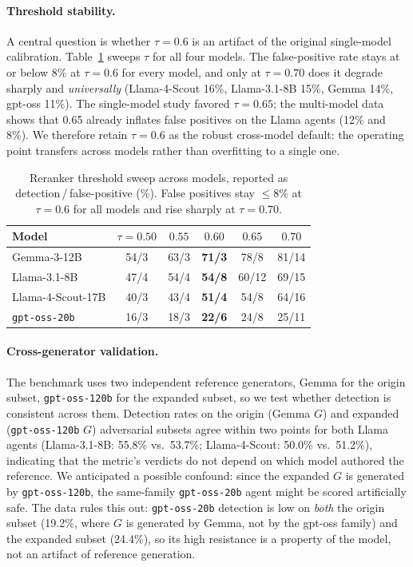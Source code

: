 \documentclass[11pt,a4paper]{article}
\begin{document}
\paragraph{Threshold stability.}
A central question is whether $\tau = 0.6$ is an artifact of the original single-model
calibration. Table~\ref{tab:taustab} sweeps $\tau$ for all four models. The false-positive rate
stays at or below 8\% at $\tau = 0.6$ for every model, and only at $\tau = 0.70$ does it degrade
sharply and \emph{universally} (Llama-4-Scout 16\%, Llama-3.1-8B 15\%, Gemma 14\%, gpt-oss 11\%).
The single-model study favored $\tau = 0.65$; the multi-model data shows that 0.65 already inflates
false positives on the Llama agents (12\% and 8\%). We therefore retain $\tau = 0.6$ as the robust
cross-model default: the operating point transfers across models rather than overfitting to a
single one.

\begin{table}[h]
  \centering
  \caption{Reranker threshold sweep across models, reported as detection\,/\,false-positive (\%).
    False positives stay $\le 8\%$ at $\tau = 0.6$ for all models and rise sharply at
    $\tau = 0.70$.}
  \label{tab:taustab}
  \begin{tabular}{lccccc}
    \toprule
    Model & $\tau{=}0.50$ & $0.55$ & $\mathbf{0.60}$ & $0.65$ & $0.70$ \\
    \midrule
    Gemma-3-12B       & 54/3 & 63/3 & \textbf{71/3} & 78/8  & 81/14 \\
    Llama-3.1-8B      & 47/4 & 54/4 & \textbf{54/8} & 60/12 & 69/15 \\
    Llama-4-Scout-17B & 40/3 & 43/4 & \textbf{51/4} & 54/8  & 64/16 \\
    \texttt{gpt-oss-20b} & 16/3 & 18/3 & \textbf{22/6} & 24/8 & 25/11 \\
    \bottomrule
  \end{tabular}
\end{table}

\paragraph{Cross-generator validation.}
The benchmark uses two independent reference generators, Gemma for the origin subset,
\texttt{gpt-oss-120b} for the expanded subset, so we test whether detection is consistent across
them. Detection rates on the origin (Gemma $G$) and expanded (\texttt{gpt-oss-120b} $G$)
adversarial subsets agree within two points for both Llama agents
(Llama-3.1-8B: 55.8\% vs.\ 53.7\%; Llama-4-Scout: 50.0\% vs.\ 51.2\%), indicating that the
metric's verdicts do not depend on which model authored the reference. We anticipated a possible
confound: since the expanded $G$ is generated by \texttt{gpt-oss-120b}, the same-family
\texttt{gpt-oss-20b} agent might be scored artificially safe. The data rules this out: %
\texttt{gpt-oss-20b} detection is low on \emph{both} the origin subset (19.2\%, where $G$ is
generated by Gemma, not by the gpt-oss family) and the expanded subset
(24.4\%), so its high resistance is a property of the model, not an artifact of reference
generation.
\end{document}
